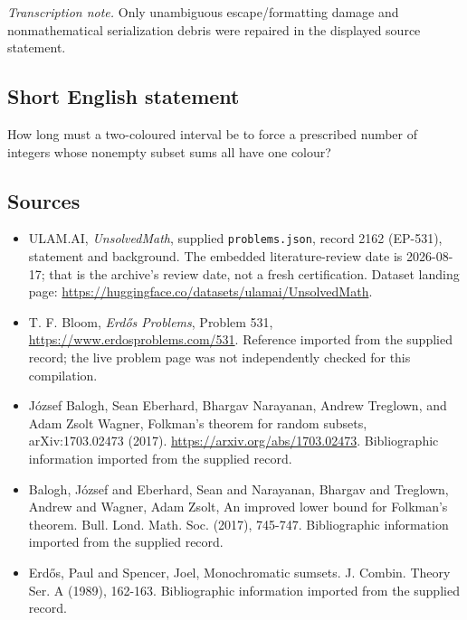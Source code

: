 \documentclass[11pt,a4paper]{article}
\begin{document}
{\small\emph{Transcription note.} Only unambiguous escape/formatting damage and nonmathematical serialization debris were repaired in the displayed source statement.}

\subsection{Short English statement}

How long must a two-coloured interval be to force a prescribed number of integers whose nonempty subset sums all have one colour?

\subsection{Sources}

{\small

\begin{itemize}

\item[\hypertarget{source:2162:1}{S1}] ULAM.AI, \emph{UnsolvedMath}, supplied \texttt{problems.json}, record 2162 (EP-531), statement and background. The embedded literature-review date is 2026-08-17; that is the archive’s review date, not a fresh certification. Dataset landing page: \url{https://huggingface.co/datasets/ulamai/UnsolvedMath}.

\item[\hypertarget{source:2162:2}{S2}] T. F. Bloom, \emph{Erdős Problems}, Problem 531, \url{https://www.erdosproblems.com/531}. Reference imported from the supplied record; the live problem page was not independently checked for this compilation.

\item[\hypertarget{source:2162:3}{S3}] József Balogh, Sean Eberhard, Bhargav Narayanan, Andrew Treglown, and Adam Zsolt Wagner, Folkman's theorem for random subsets, arXiv:1703.02473 (2017). \url{https://arxiv.org/abs/1703.02473}. Bibliographic information imported from the supplied record.

\item[\hypertarget{source:2162:4}{S4}] Balogh, J\'{o}zsef and Eberhard, Sean and Narayanan, Bhargav and Treglown, Andrew and Wagner, Adam Zsolt, An improved lower bound for Folkman's theorem. Bull. Lond. Math. Soc. (2017), 745-747. Bibliographic information imported from the supplied record.

\item[\hypertarget{source:2162:5}{S5}] Erd\H{o}s, Paul and Spencer, Joel, Monochromatic sumsets. J. Combin. Theory Ser. A (1989), 162-163. Bibliographic information imported from the supplied record.

\end{itemize}

}

\label{end:2162}
\end{document}

